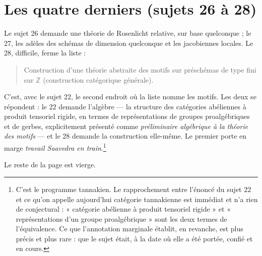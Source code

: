 \documentclass[11pt,a4paper]{article}
\begin{document}
\section*{Les quatre derniers (sujets 26 à 28)}

Le sujet 26 demande une théorie de Rosenlicht relative, sur base quelconque ;
le 27, les adèles des schémas de dimension quelconque et les jacobiennes
locales. Le 28, difficile, ferme la liste :

\begin{quote}
Construction d'une théorie abstraite des motifs sur préschémas de type fini sur
$\mathbb{Z}$ (construction catégorique générale).
\end{quote}

C'est, avec le sujet 22, le second endroit où la liste nomme les motifs. Les
deux se répondent : le 22 demande l'algèbre --- la structure des catégories
abéliennes à produit tensoriel rigide, en termes de représentations de groupes
proalgébriques et de gerbes, explicitement présenté comme \emph{préliminaire
algébrique à la théorie des motifs} --- et le 28 demande la construction
elle-même. Le premier porte en marge \emph{travail Saavedra en
train}.\footnote{C'est le programme tannakien. Le rapprochement entre l'énoncé
du sujet 22 et ce qu'on appelle aujourd'hui catégorie tannakienne est immédiat
et n'a rien de conjectural : « catégorie abélienne à produit tensoriel rigide »
et « représentations d'un groupe proalgébrique » sont les deux termes de
l'équivalence. Ce que l'annotation marginale établit, en revanche, est plus
précis et plus rare : que le sujet était, à la date où elle a été portée,
confié et en cours.}

Le reste de la page est vierge.
\end{document}

